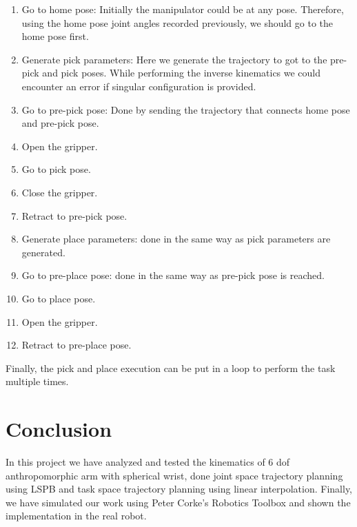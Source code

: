 \begin{enumerate}
        \item  Go to home pose: Initially the manipulator could be at any pose. Therefore, using the home pose joint angles recorded previously, we should go to the home pose first.
        \item  Generate pick parameters: Here we generate the trajectory to got to the pre-pick and pick poses. While performing the inverse kinematics we could encounter an error if singular configuration is provided.
        \item  Go to pre-pick pose: Done by sending the trajectory that connects home pose and pre-pick pose.
        \item  Open the gripper.
        \item  Go to pick pose.
        \item  Close the gripper.
        \item  Retract to pre-pick pose.
        \item  Generate place parameters: done in the same way as pick parameters are generated.
        \item  Go to pre-place pose: done in the same way as pre-pick pose is reached.
        \item  Go to place pose.
        \item  Open the gripper.
        \item  Retract to pre-place pose.
\end{enumerate}
Finally, the pick and place execution can be put in a loop to perform the task multiple times. 
\cleardoublepage
\section{Conclusion} \label{sec:conclusion}
In this project we have analyzed and tested the kinematics of 6 dof anthropomorphic arm with spherical wrist,
done joint space trajectory planning using LSPB and task space trajectory planning using linear interpolation.
Finally, we have simulated our work using Peter Corke's Robotics Toolbox and shown the implementation in the real robot.
